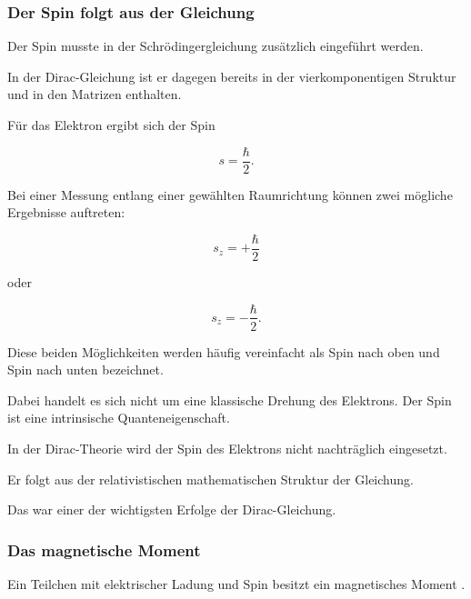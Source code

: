 \subsubsection*{Der Spin folgt aus der Gleichung}

Der Spin musste in der
Schrödingergleichung zusätzlich eingeführt werden.

In der Dirac-Gleichung ist er dagegen bereits in der
vierkomponentigen Struktur und in den Matrizen enthalten.

Für das Elektron ergibt sich der Spin

\begin{equation}
	s
	=
	\frac{\hbar}{2}.
	\label{eq:spin_aus_diracgleichung}
\end{equation}

Bei einer Messung entlang einer gewählten Raumrichtung können zwei
mögliche Ergebnisse auftreten:

\begin{equation}
	s_z
	=
	+\frac{\hbar}{2}
\end{equation}

oder

\begin{equation}
	s_z
	=
	-\frac{\hbar}{2}.
\end{equation}

Diese beiden Möglichkeiten werden häufig vereinfacht als
Spin nach oben und Spin nach unten bezeichnet.

Dabei handelt es sich nicht um eine klassische Drehung des Elektrons.
Der Spin ist eine intrinsische Quanteneigenschaft.

\begin{PhysicsBox}
	\label{box:spin_keine_zusatzannahme_dirac}
	
	In der Dirac-Theorie wird der Spin des Elektrons nicht nachträglich
	eingesetzt.
	
	Er folgt aus der relativistischen mathematischen Struktur der
	Gleichung.
	
	Das war einer der wichtigsten Erfolge der Dirac-Gleichung.
\end{PhysicsBox}

\subsubsection*{Das magnetische Moment}

Ein Teilchen mit elektrischer Ladung und Spin besitzt ein
magnetisches Moment%
.

